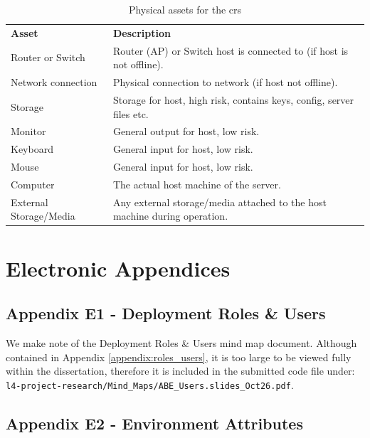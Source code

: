 \begin{appendices}
\begin{table}[htp]
  \begin{tabularx}{\linewidth}{lX}
    \textbf{Asset}          & \textbf{Description} \\
    Router or Switch        &	Router (AP) or Switch host is connected to (if host is not offline). \\
    Network connection      &	Physical connection to network (if host not offline). \\
    Storage                 &	Storage for host, high risk, contains keys, config, server files etc. \\
    Monitor                 &	General output for host, low risk. \\
    Keyboard                &	General input for host, low risk. \\
    Mouse                   &	General input for host, low risk. \\
    Computer                &	The actual host machine of the server. \\
    External Storage/Media  &	Any external storage/media attached to the host machine during operation. \\
  \end{tabularx}
  \caption{Physical assets for the \acrfull{crs}}
  \label{tab:physical_assets_cr}
\end{table}

\section{Electronic Appendices}
\label{appendix:electronic_appendices}

\subsection{Appendix E1 - Deployment Roles \& Users}
\label{appendix:e_roles_users}

We make note of the Deployment Roles \& Users mind map document. Although contained in Appendix \ref{appendix:roles_users}, it is too large to be viewed fully within the dissertation, therefore it is included in the submitted code file under: \texttt{l4-project-research/Mind\_Maps/ABE\_Users.slides\_Oct26.pdf}.

\subsection{Appendix E2 - Environment Attributes}
\label{appendix:e_environments}


\end{appendices}
